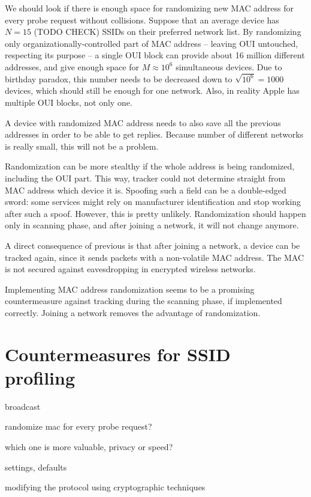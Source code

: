 \documentclass[12pt,a4paper,oneside,pdftex]{report}
\begin{document}
We should look if there is enough space for randomizing new MAC address for every probe request without collisions. Suppose that an average device has $N = 15$ (TODO CHECK) SSIDs on their preferred network list. By randomizing only organizationally-controlled part of MAC address -- leaving OUI untouched, respecting its purpose -- a single OUI block can provide about 16 million different addresses, and give enough space for $M \approx 10^6$ simultaneous devices. Due to birthday paradox, this number needs to be decreased down to $\sqrt{10^6} = 1000$ devices, which should still be enough for one network. Also, in reality Apple has multiple OUI blocks, not only one.

A device with randomized MAC address needs to also save all the previous addresses in order to be able to get replies. Because number of different networks is really small, this will not be a problem.

Randomization can be more stealthy if the whole address is being randomized, including the OUI part. This way, tracker could not determine straight from MAC address which device it is. Spoofing such a field can be a double-edged sword: some services might rely on manufacturer identification and stop working after such a spoof. However, this is pretty unlikely. Randomization should happen only in scanning phase, and after joining a network, it will not change anymore.

A direct consequence of previous is that after joining a network, a device can be tracked again, since it sends packets with a non-volatile MAC address. The MAC is not secured against eavesdropping in encrypted wireless networks.

Implementing MAC address randomization seems to be a promising countermeasure against tracking during the scanning phase, if implemented correctly. Joining a network removes the advantage of randomization.

\section{Countermeasures for SSID profiling}
\label{sec:countermeasures_ssid}
broadcast

randomize mac for every probe request?

which one is more valuable, privacy or speed?

settings, defaults

modifying the protocol using cryptographic techniques~\cite{lindqvist2009privacy}
\end{document}
